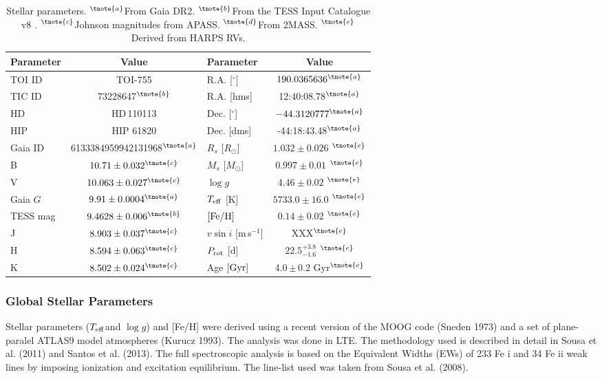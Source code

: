 \documentclass[fleqn,usenatbib]{mnras}
\newcommand{\harps}{{HARPS}}
\newcommand{\ms}{m\,s$^{-1}$}
\newcommand{\msun}{\mbox{$M_{\odot}$}}
\newcommand{\rsun}{\mbox{$R_{\odot}$}}
\newcommand{\teff}{$T_{\rm eff}$}
\newcommand{\feh}{\mbox{$\rm [Fe/H]$}}
\newcommand{\logg}{$\log g$}
\newcommand{\TTeff}{ $ 5733.0 \pm 16.0 $ }
\newcommand{\Tlogg}{ $ 4.46 \pm 0.02 $ }
\newcommand{\TFeH}{ $ 0.14 \pm 0.02 $ }
\newcommand{\TMs}{ $ 0.997 \pm 0.01 $ }
\newcommand{\TRs}{ $ 1.032 \pm 0.026 $ }
\newcommand{\Tperiod}{ $ 22.5^{+3.8}_{-1.6} $ }
\newcommand{\TTstar}{TOI-755}
\newcommand{\Tstar}{HD\,110113}
\newcommand{\Tstarage}{4.0\,$\pm$\,0.2 Gyr}
\newcommand{\TGAIAid}{6133384959942131968}
\begin{document}
\begin{table}
    \centering
    \begin{tabular}{lc|lc}
        \hline
        \hline
        Parameter & Value & Parameter & Value \\
        \hline
        \hline
        TOI ID & \TTstar & R.A. [$^{\circ}$] & $190.0365636^{\tnote{a}}$ \\
        TIC ID & 73228647$^{\tnote{b}}$ & R.A. [hms] & 12:40:08.78$^{\tnote{a}}$ \\
        HD & \Tstar & Dec. [$^{\circ}$] & $-44.3120777^{\tnote{a}}$\\
        HIP & HIP 61820 & Dec. [dms] & -44:18:43.48$^{\tnote{a}}$ \\
        Gaia ID & \TGAIAid$^{\tnote{a}}$ & $R_s$ [\rsun{}] & \TRs{}$^{\tnote{e}}$ \\
        B & $10.71\pm0.032^{\tnote{c}}$ & $M_s$ [\msun{}] & \TMs{}$^{\tnote{e}}$ \\
        V & $10.063\pm0.027^{\tnote{c}}$ & \logg{} & \Tlogg{}$^{\tnote{e}}$ \\
        Gaia $G$ & $9.91\pm0.0004 ^{\tnote{a}}$ & \teff{} [K] & \TTeff{}$^{\tnote{e}}$ \\
        TESS mag & $9.4628\pm0.006^{\tnote{b}}$ & \feh{} & \TFeH{}$^{\tnote{e}}$ \\
        J & $8.903 \pm 0.037^{\tnote{c}}$ & $v\sin{i}$ [\ms{}] & XXX$^{\tnote{e}}$\\
        H & $8.594 \pm 0.063^{\tnote{c}}$ & $P_{\rm rot}$ [d] & \Tperiod{}$^{\tnote{e}}$\\
        K & $8.502 \pm0.024^{\tnote{c}}$ & Age $[{\rm Gyr}]$ & \Tstarage{}$^{\tnote{e}}$ \\
        \hline
        \hline
    \end{tabular}
    \caption{Stellar parameters.
    $^{\tnote{a}}$From Gaia DR2\citep{brown2018gaia}. $^{\tnote{b}}$From the TESS Input Catalogue v8 \citep{stassun2019revised}. $^{\tnote{c}}$Johnson magnitudes from APASS\citep{apass}. $^{\tnote{d}}$From 2MASS\citep{skrutskie2006two}. $^{\tnote{e}}$Derived from \harps{} RVs.}
    \label{tab:starpars}
\end{table}

\subsubsection{Global Stellar Parameters}
Stellar parameters (\teff and \logg) and [Fe/H] were derived using
a recent version of the MOOG code (Sneden 1973) and a set of plane-paralel
ATLAS9 model atmospheres (Kurucz 1993). The analysis was done in LTE. The methodology used is described 
in detail in Sousa et al. (2011) and Santos et al. (2013). The full spectroscopic analysis is 
based on the Equivalent Widths (EWs) of 233 Fe i and 34 Fe ii weak lines
by imposing ionization and excitation equilibrium. The line-list used
was taken from Sousa et al. (2008). 
\end{document}
